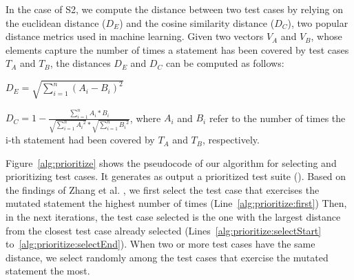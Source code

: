 In the case of S2, we compute the distance between two test cases by relying on the euclidean distance ($D_E$) and the cosine similarity distance ($D_C$), two popular distance metrics used in machine learning.
Given two vectors $V_A$ and $V_B$, whose elements capture the number of times a statement has been covered by test cases $T_A$ and $T_B$, the distances $D_E$ and $D_C$ can be computed as follows:

$D_E=\sqrt{\sum_{i=1}^{n}(A_i-B_i)^2}$

$D_C= 1-\frac{\sum_{i=1}^{n}A_i*B_i}{\sqrt{\sum_{i=1}^{n}{A_i}^2}*\sqrt{\sum_{i=1}^{n}{B_i}^2}}$,
where $A_i$ and $B_i$ refer to the number of times the i-th statement had been covered by $T_A$ and $T_B$, respectively.

Figure~\ref{alg:prioritize} shows the pseudocode of our algorithm for selecting and prioritizing test cases. It generates as output
a prioritized test suite ().
Based on the findings of Zhang et al. \cite{zhang2013faster}, we first select the test case that exercises the mutated statement the highest number of times (Line~\ref{alg:prioritize:first}) 
Then, in the next iterations, the test case selected is the one with the largest distance from the closest test case already selected (Lines~\ref{alg:prioritize:selectStart} to~\ref{alg:prioritize:selectEnd}). 
When two or more test cases have the same distance, we select randomly among the test cases that exercise the mutated statement the most.



